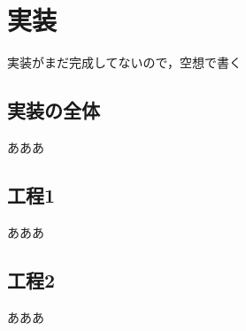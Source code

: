 \chapter{実装}
\label{chap:implementation}

実装がまだ完成してないので，空想で書く

\section{実装の全体}

あああ

\section{工程1}

あああ

\section{工程2}

あああ
